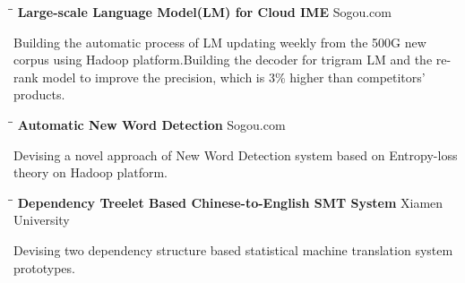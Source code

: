 \documentclass{res}
\begin{document}
\begin{resume}
   \vspace{-0.1in}	
   \begin{tabbing}
   \hspace{2.5in}\= \hspace{3in}\= \kill %
    {\bf Large-scale Language Model(LM) for Cloud IME} \> \>Sogou.com     \\
   \end{tabbing}\vspace{-30pt}      %
   Building the automatic process of LM updating weekly from the 500G new corpus using Hadoop platform.Building the decoder for trigram LM and the re-rank model to improve the precision, which is 3\% higher than competitors' products.
   \vspace{-0.1in}	
   \begin{tabbing}
   \hspace{2.5in}\= \hspace{3in}\= \kill %
    {\bf Automatic New Word Detection}\> \>Sogou.com     \\
   \end{tabbing}\vspace{-30pt}      %
   Devising a novel approach of New Word Detection system based on Entropy-loss theory on Hadoop platform.\\
   \vspace{-0.2in}	
   \begin{tabbing}
   \hspace{2.5in}\= \hspace{3in}\= \kill %
    {\bf Dependency Treelet Based Chinese-to-English SMT System} \> \>Xiamen University\\
   \end{tabbing}\vspace{-30pt}      %
   Devising two dependency structure based statistical machine translation system prototypes. 

\end{resume}
\end{document}
